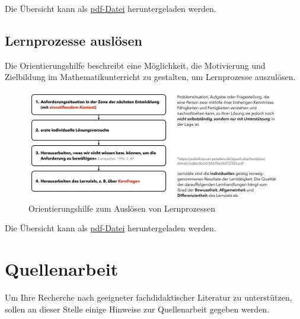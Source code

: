 \documentclass[
]{scrbook}
\theoremstyle{definition}
\theoremstyle{definition}
\theoremstyle{definition}
\theoremstyle{definition}
\theoremstyle{remark}
\begin{document}
Die Übersicht kann als \href{files/Stoffdidaktik2024-OrientierungshilfeKernidee.pdf}{pdf-Datei} heruntergeladen werden.

\section{Lernprozesse auslösen}\label{orientierungshilfe-lernprozesse-ausloesen}

Die Orientierungshilfe beschreibt eine Möglichkeit, die Motivierung und Zielbildung im Mathematikunterricht zu gestalten, um Lernprozesse auszulösen.

\begin{figure}

{\centering \includegraphics[width=0.9\linewidth]{pictures/C-OrientierungshilfeLernprozesseAusloesen} 

}

\caption{Orientierungshilfe zum Auslösen von Lernprozessen}\label{fig:OrientierungAusloesen}
\end{figure}

Die Übersicht kann als \href{files/Stoffdidaktik2024-OrientierungshilfeLernprozesseAusloesen.pdf}{pdf-Datei} heruntergeladen werden.

\chapter{Quellenarbeit}\label{quellenarbeit}

Um Ihre Recherche nach geeigneter fachdidaktischer Literatur zu unterstützen, sollen an dieser Stelle einige Hinweise zur Quellenarbeit gegeben werden.
\end{document}
